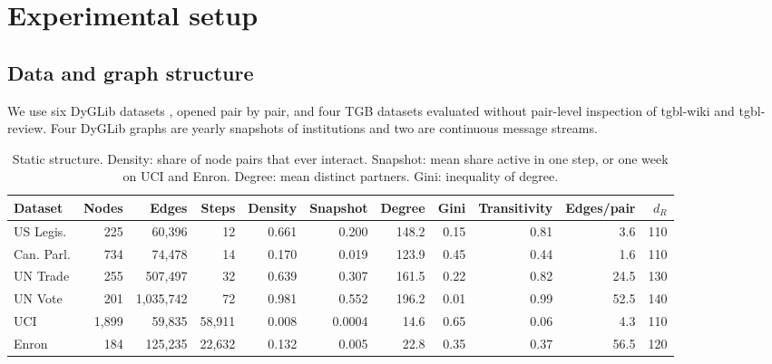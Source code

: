 \documentclass[11pt,a4paper]{article}
\theoremstyle{plain}
\theoremstyle{definition}
\begin{document}
\section{Experimental setup}\label{sec:setup}
\subsection{Data and graph structure}\label{sec:data}
We use six DyGLib datasets \cite{dygformer}, opened pair by pair, and four TGB datasets \cite{tgb} evaluated without pair-level inspection of tgbl-wiki and tgbl-review. Four DyGLib graphs are yearly snapshots of institutions and two are continuous message streams.

\begin{table}[H]\centering\small\setlength{\tabcolsep}{3.6pt}
\begin{tabular}{lrrrrrrrrrr}
\toprule
Dataset & Nodes & Edges & Steps & Density & Snapshot & Degree & Gini & Transitivity & Edges/pair & $d_R$\\
\midrule
US Legis. & 225 & 60,396 & 12 & 0.661 & 0.200 & 148.2 & 0.15 & 0.81 & 3.6 & 110\\
Can. Parl. & 734 & 74,478 & 14 & 0.170 & 0.019 & 123.9 & 0.45 & 0.44 & 1.6 & 110\\
UN Trade & 255 & 507,497 & 32 & 0.639 & 0.307 & 161.5 & 0.22 & 0.82 & 24.5 & 130\\
UN Vote & 201 & 1,035,742 & 72 & 0.981 & 0.552 & 196.2 & 0.01 & 0.99 & 52.5 & 140\\
UCI & 1,899 & 59,835 & 58,911 & 0.008 & 0.0004 & 14.6 & 0.65 & 0.06 & 4.3 & 110\\
Enron & 184 & 125,235 & 22,632 & 0.132 & 0.005 & 22.8 & 0.35 & 0.37 & 56.5 & 120\\
\bottomrule
\end{tabular}
\caption{Static structure. Density: share of node pairs that ever interact. Snapshot: mean share active in one step, or one week on UCI and Enron. Degree: mean distinct partners. Gini: inequality of degree.}\label{tab:static}
\end{table}
\end{document}
